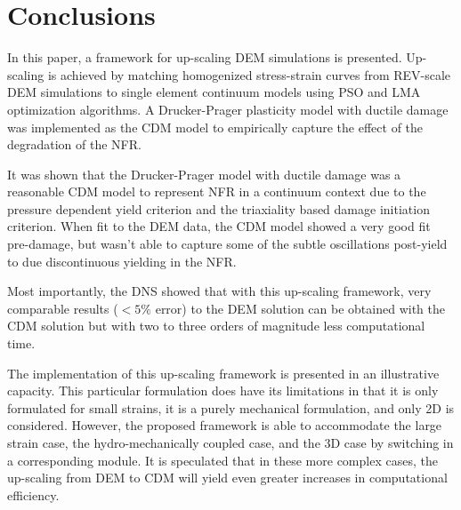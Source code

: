 \section{Conclusions}
In this paper, a framework for up-scaling DEM simulations is presented. Up-scaling is achieved by matching homogenized stress-strain curves from REV-scale DEM simulations to single element continuum models using PSO and LMA optimization algorithms. A Drucker-Prager plasticity model with ductile damage was implemented as the CDM model to empirically capture the effect of the degradation of the NFR.

It was shown that the Drucker-Prager model with ductile damage was a reasonable CDM model to represent NFR in a continuum context due to the pressure dependent yield criterion and the triaxiality based damage initiation criterion. When fit to the DEM data, the CDM model showed a very good fit pre-damage, but wasn't able to capture some of the subtle oscillations post-yield to due discontinuous yielding in the NFR.

Most importantly, the DNS showed that with this up-scaling framework, very comparable results ($<5\%$ error) to the DEM solution can be obtained with the CDM solution but with two to three orders of magnitude less computational time.

The implementation of this up-scaling framework is presented in an illustrative capacity. This particular formulation does have its limitations in that it is only formulated for small strains, it is a purely mechanical formulation, and only 2D is considered. However, the proposed framework is able to accommodate the large strain case, the hydro-mechanically coupled case, and the 3D case by switching in a corresponding module. It is speculated that in these more complex cases, the up-scaling from DEM to CDM will yield even greater increases in computational efficiency. 











\clearpage